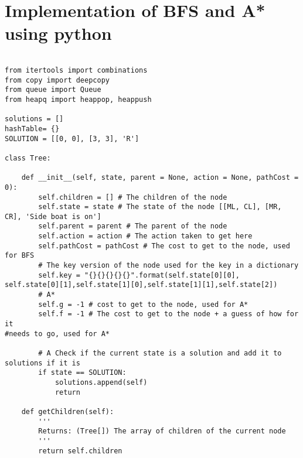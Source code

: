 \documentclass{article}
\begin{document}
\section{Implementation of BFS and A* using python}
\begin{verbatim}

from itertools import combinations
from copy import deepcopy
from queue import Queue
from heapq import heappop, heappush

solutions = []
hashTable= {}
SOLUTION = [[0, 0], [3, 3], 'R']

class Tree:

    def __init__(self, state, parent = None, action = None, pathCost = 0):
        self.children = [] # The children of the node 
        self.state = state # The state of the node [[ML, CL], [MR, CR], 'Side boat is on']
        self.parent = parent # The parent of the node
        self.action = action # The action taken to get here
        self.pathCost = pathCost # The cost to get to the node, used for BFS
        # The key version of the node used for the key in a dictionary
        self.key = "{}{}{}{}{}".format(self.state[0][0],
self.state[0][1],self.state[1][0],self.state[1][1],self.state[2])
        # A*
        self.g = -1 # cost to get to the node, used for A*
        self.f = -1 # The cost to get to the node + a guess of how for it 
#needs to go, used for A*

        # A Check if the current state is a solution and add it to solutions if it is
        if state == SOLUTION:
            solutions.append(self)
            return
    
    def getChildren(self):
        '''
        Returns: (Tree[]) The array of children of the current node
        '''
        return self.children
\end{verbatim}
\newpage
\end{document}

